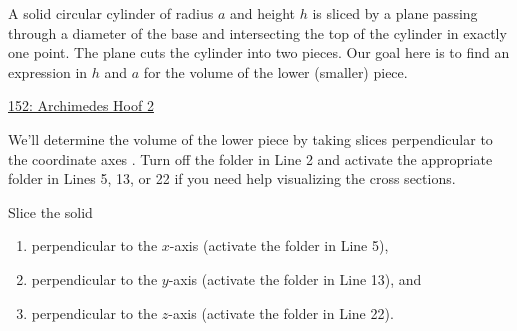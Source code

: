 \documentclass{ximera}
\begin{document}
\begin{question} \label{QKDFMReR}
A solid circular cylinder of radius $a$ and height $h$ is sliced by a plane passing through a diameter of the base and intersecting the top of the cylinder in exactly one point. The plane cuts the cylinder into two pieces. Our goal here is to find an expression in $h$ and $a$ for the volume of the lower (smaller) piece.

\begin{onlineOnly}
    \begin{center}
\end{center}
\end{onlineOnly}

\href{https://www.desmos.com/3d/cnspcoiggo}{152: Archimedes Hoof 2}

We'll determine the volume of the lower piece by taking slices perpendicular to the coordinate axes . Turn off the folder in Line 2 and activate the appropriate folder in Lines 5, 13, or 22 if you need help visualizing the cross sections.

Slice the solid 
\begin{enumerate}
\item perpendicular to the $x$-axis (activate the folder in Line 5),

\item perpendicular to the $y$-axis (activate the folder in Line 13), and

\item perpendicular to the $z$-axis (activate the folder in Line 22).
\end{enumerate} 

\end{question}
\end{document}
